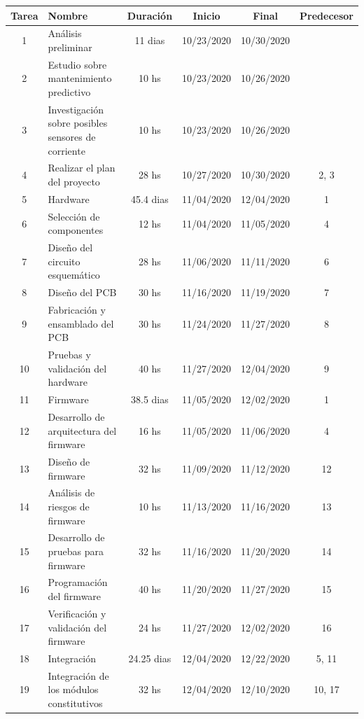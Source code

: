 \documentclass[11pt]{charter}
\begin{document}
\begin{table}[htpb]
\centering
\begin{tabularx}{\linewidth}{@{}|c|X|c|c|c|c|@{}}
\hline
\rowcolor[HTML]{C0C0C0} 
Tarea & Nombre & Duración & Inicio & Final & Predecesor \\ \hline
1 & Análisis preliminar & 11 dias &  10/23/2020 & 10/30/2020 & \\ \hline
2 & Estudio sobre mantenimiento predictivo &  10 hs & 10/23/2020 & 	10/26/2020	 &\\ \hline
3 & Investigación sobre posibles sensores de corriente &  10 hs & 10/23/2020 & 10/26/2020	 & \\ \hline
4 & Realizar el plan del proyecto &  28 hs & 10/27/2020 & 	10/30/2020 & 2, 3 \\ \hline		
5 & Hardware &  45.4 dias & 11/04/2020 & 	12/04/2020 & 1\\ \hline
6 & Selección de componentes &  12 hs & 11/04/2020 & 	11/05/2020 & 4\\ \hline
7 & Diseño del circuito esquemático &  28 hs & 11/06/2020 & 	11/11/2020	 &6\\ \hline
8 & Diseño del PCB &  30 hs & 11/16/2020 & 	11/19/2020 &7\\ \hline
9 & Fabricación y ensamblado del PCB &  30 hs & 11/24/2020 & 	11/27/2020	 & 8\\ \hline
10 & Pruebas y validación del hardware &  40 hs & 11/27/2020 & 	12/04/2020	 & 9	\\ \hline
11 & Firmware &  38.5 dias &11/05/2020	 & 12/02/2020 &  1\\ \hline
12 & Desarrollo de arquitectura del firmware &   16 hs & 11/05/2020 & 	11/06/2020 & 4\\ \hline
13 & Diseño de firmware &  32 hs & 11/09/2020 & 	11/12/2020 & 12\\ \hline
14 & Análisis de riesgos de firmware &  10 hs & 11/13/2020 & 	11/16/2020 & 13\\ \hline
15 & Desarrollo de pruebas para firmware &  32 hs & 11/16/2020 & 	11/20/2020 & 14\\ \hline
16 & Programación del firmware &  40 hs & 11/20/2020 & 	11/27/2020 & 15\\ \hline
17 & Verificación y validación del firmware  & 24 hs &11/27/2020 & 	12/02/2020 & 16 \\ \hline
18 & Integración &  24.25 dias & 12/04/2020 & 	12/22/2020 &5, 11\\ \hline
19 & Integración de los módulos constitutivos &  32 hs & 12/04/2020 & 	12/10/2020 & 10, 17\\ \hline

\end{tabularx}
\end{table}
\end{document}
